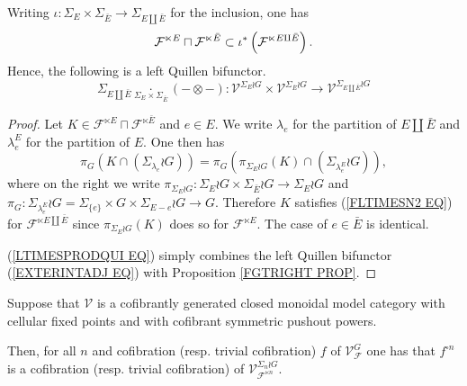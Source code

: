 \documentclass[a4paper,10pt]{article}%
\begin{document}
\begin{proposition}\label{LTIMESPRODINC PROP}
	Writing 
	$\iota \colon \Sigma_E \times \Sigma_{\bar{E}} \to
	\Sigma_{E \amalg \bar{E}}$ for the inclusion, one has 
	\begin{equation}\label{LTIMESPRODINC EQ}
	\mathcal{F}^{\ltimes E}
		\sqcap
	\mathcal{F}^{\ltimes \bar{E}}
		\subset
	\iota^{\**}\left(\mathcal{F}^{\ltimes E \amalg \bar{E}}\right).
	\end{equation}
	Hence, the following is a left Quillen bifunctor.
\begin{equation}\label{LTIMESPRODQUI EQ}
	\Sigma_{E \amalg \bar{E}} 
	\underset{\Sigma_E \times \Sigma_{\bar{E}}}{\cdot}
	(\minus \otimes \minus)
		\colon
	\mathcal{V}^{\Sigma_E \wr G}
		\times
	\mathcal{V}^{\Sigma_{\bar{E}} \wr G}
		\to
	\mathcal{V}^{\Sigma_{E \amalg \bar{E}} \wr G}
\end{equation}
\end{proposition}



\begin{proof}
	Let 
	$K \in 
	\mathcal{F}^{\ltimes E}
		\sqcap
	\mathcal{F}^{\ltimes \bar{E}}	
	$
	and $e \in E$. 
	We write $\lambda_e$ for the partition of $E \amalg \bar{E}$
	and $\lambda_e^E$ for the partition of $E$.
	One then has
\begin{equation}
\pi_G
\left(
	K \cap \left( \Sigma_{\lambda_e} \wr G \right) \right)
	=
\pi_G
\left(
	\pi_{\Sigma_E \wr G}(K)
	\cap \left( \Sigma_{\lambda_e^E} \wr G \right)
\right),
\end{equation}
where on the right we write
$\pi_{\Sigma_E \wr G} \colon
\Sigma_E \wr G \times \Sigma_{\bar{E}} \wr G
\to 
\Sigma_E \wr G$
and 
$\pi_G \colon \Sigma_{\lambda^E_e} \wr G
=\Sigma_{\{e\}} \times G \times \Sigma_{E-e} \wr G
\to G$. Therefore $K$ 
satisfies (\ref{FLTIMESN2 EQ}) for 
$\mathcal{F}^{\ltimes E \amalg \bar{E}}$
since 
$\pi_{\Sigma_E \wr G}(K)$ does so for 
$\mathcal{F}^{\ltimes E}$.
The case of $e \in \bar{E}$ is identical.

(\ref{LTIMESPRODQUI EQ}) simply combines 
the left Quillen bifunctor
(\ref{EXTERINTADJ EQ}) with 
Proposition \ref{FGTRIGHT PROP}.
\end{proof}


\begin{proposition}\label{POWERF PROP}
	Suppose that $\mathcal{V}$ is a cofibrantly generated closed monoidal model category with cellular fixed points and with cofibrant symmetric pushout powers.
	
	Then, for all $n$ and cofibration (resp. trivial cofibration) $f$ of $\mathcal{V}^{G}_{\mathcal{F}}$
	one has that $f^{\square n}$ is a cofibration (resp. trivial cofibration) of $\mathcal{V}^{\Sigma_n \wr G}_{\mathcal{F}^{\ltimes n}}$.
\end{proposition}
\end{document}
